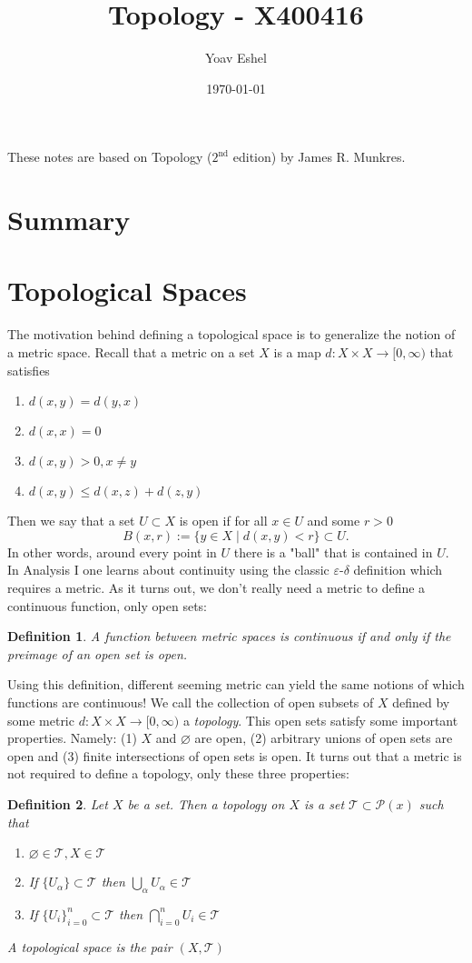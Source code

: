 \documentclass{article}
\title{Topology - X400416}
\author{Yoav Eshel}
\date{\today}
\newcommand{\Ta}{\mathcal{T}}
\newtheorem*{definition}{Definition}
\theoremstyle{remark}
\begin{document}
\maketitle
\tableofcontents
\newpage

These notes are based on Topology ($2^\text{nd}$ edition) by James R. Munkres. 
\section{Summary}
\section{Topological Spaces}
The motivation behind defining a topological space is to generalize the notion of a metric space.
Recall that a metric on a set $X$ is a map $d:X\times X \to [0,\infty)$ that satisfies
\begin{enumerate}
    \item $d(x,y)=d(y,x)$
    \item $d(x,x)=0$
    \item $d(x,y)>0, x\not=y$
    \item $d(x,y)\leq d(x,z)+d(z,y)$
\end{enumerate}
Then we say that a set $U\subset X$ is open if for all $x\in U$ and some $r>0$ 
$$
    B(x,r):=\{y\in X\mid d(x,y)<r\}\subset U.
$$
In other words, around every point in $U$ there is a "ball" that is contained in $U$. 
In Analysis I one learns about continuity using the classic $\varepsilon$-$\delta$ definition which requires a metric.
As it turns out, we don't really need a metric to define a continuous function, only open sets:
\begin{definition}
    A function between metric spaces is continuous if and only if the preimage of an open set is open.
\end{definition}
Using this definition, different seeming metric can yield the same notions of which functions are continuous! 
We call the collection of open subsets of $X$ defined by some metric $d:X\times X\to [0,\infty)$ a \textit{topology}.
This open sets satisfy some important properties. Namely: (1) $X$ and $\varnothing$ are open, (2) arbitrary unions of open sets are open and (3) finite intersections of open sets is open.
It turns out that a metric is not required to define a topology, only these three properties:
\begin{definition}
    Let $X$ be a set. Then a topology on $X$ is a set $\mathcal{T}\subset\mathcal{P}(x)$ such that
    \begin{enumerate}
        \item $\varnothing\in\Ta, X\in\Ta$
        \item If $\{U_{\alpha}\}\subset\Ta$ then  $\bigcup_{\alpha}U_{\alpha}\in\Ta$
        \item If $\{U_i\}_{i=0}^n\subset\Ta$ then $\bigcap_{i=0}^n U_i\in\Ta$
    \end{enumerate}
    A topological space is the pair $(X,\Ta)$
\end{definition}
\end{document}
